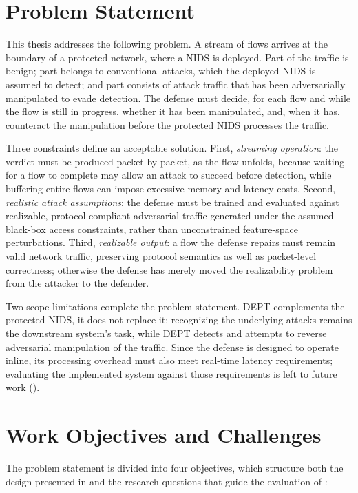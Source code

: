 \section{Problem Statement}\label{sec:intro-problem}
This thesis addresses the following problem.
A stream of flows arrives at the
boundary of a protected network, where a \ac{NIDS} is deployed. Part of the traffic is
benign; part belongs to conventional attacks, which the deployed \ac{NIDS} is assumed to
detect; and part consists of attack traffic that has been adversarially manipulated to evade detection.
The defense must decide, for each flow and while the
flow is still in progress, whether it has been manipulated, and, when it has, counteract
the manipulation before the protected \ac{NIDS} processes the traffic.

Three constraints define an acceptable solution. First, \emph{streaming operation}: the
verdict must be produced packet by packet, as the flow unfolds, because waiting for a flow to complete may allow an attack to succeed before detection, while buffering entire flows can impose excessive memory and latency costs. 
Second, \emph{realistic attack assumptions}:
the defense must be trained and evaluated against realizable, protocol-compliant adversarial
traffic generated under the assumed black-box access constraints, rather than unconstrained feature-space perturbations.
Third, \emph{realizable
output}: a flow the defense repairs must remain valid network traffic, preserving protocol semantics as well as packet-level correctness; otherwise the defense has merely moved the
realizability problem from the attacker to the defender.

Two scope limitations complete the problem statement. DEPT complements the protected \ac{NIDS}, it does
not replace it: recognizing the underlying attacks remains the downstream system's task,
while DEPT detects and attempts to reverse adversarial manipulation of the traffic.
Since the defense is designed to operate inline, its processing overhead must also meet real-time latency requirements; evaluating the implemented system against those requirements is left to future work
().

\section{Work Objectives and Challenges}\label{sec:intro-objectives}
The problem statement is divided into four objectives, which structure both the design
presented in  and the research questions that guide the evaluation of
:

